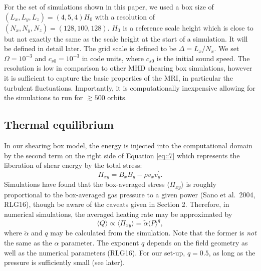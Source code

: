\documentclass[useAMS]{mn2e}
\begin{document}
For the set of simulations shown in this paper, we used a box size of
$(L_{x},L_{y},L_{z})=(4,5,4)H_{0}$  with a resolution of
$(N_{x},N_{y},N_{z})=(128,100,128)$. $H_{0}$ is a reference scale
height which is close to but not exactly the same as the scale height at the start of
a simulation. It will be defined in detail later. 
The grid scale is defined to be $\Delta=L_{x}/N_{x}$. We
set $\Omega=10^{-3}$ and $c_{s0}=10^{-3}$ in code units, where
$c_{s0}$ is the initial sound speed. The resolution is low in
comparison to other MHD shearing box simulations, however it is
sufficient to capture the basic properties of the MRI, in particular
the turbulent  fluctuations. Importantly, it is computationally
inexpensive
allowing for the simulations to run for $\gtrsim 500$ orbits.  



\subsection{Thermal equilibrium}\label{Sec:TE}

In our shearing box model, the energy is injected into the
computational domain by the second term on the right side of Equation \eqref{eq::7} which
represents the liberation of shear energy by the total stress:
\begin{equation}
\Pi_{xy}=B_xB_y - \rho v_x v_y^{\prime}.
\end{equation}
Simulations have found that the box-averaged stress $\langle \Pi_{xy}
\rangle$ is roughly proportional to the 
box-averaged gas pressure to a given power (Sano et al.~2004, RLG16),
though be aware of the caveats given in Section 2. 
Therefore, in numerical simulations, the averaged
heating rate may be approximated by 
\begin{equation}
\langle Q\rangle\propto \langle\Pi_{xy}\rangle =\tilde{\alpha}\langle P\rangle^{q},
\label{eq::9}
\end{equation}
where $\tilde{\alpha}$ and $q$ may be calculated from the simulation.
Note that the former is
\textit{not} the same as the $\alpha$ parameter.
The exponent $q$ depends on the field geometry as well as the
numerical parameters (RLG16). 
For our set-up, $q=0.5$, as long as the pressure is sufficiently
small (see later).  
\end{document}

